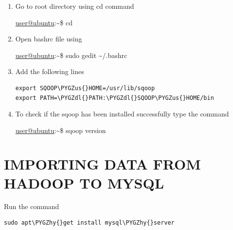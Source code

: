 \documentclass[a4paper,12pt,oneside]{sphinxmanual}
\def\PYGZus{\char`\_}
\def\PYGZdl{\char`\$}
\def\PYGZhy{\char`\-}
\begin{document}
\begin{enumerate}
\item {} 
Go to root directory using cd command

\href{mailto:user@ubuntu}{user@ubuntu}:\textasciitilde{}\$  cd

\item {} 
Open bashrc file using

\href{mailto:user@ubuntu}{user@ubuntu}:\textasciitilde{}\$  sudo gedit \textasciitilde{}/.bashrc

\item {} 
Add the following lines

\begin{Verbatim}[commandchars=\\\{\}]
export SQOOP\PYGZus{}HOME=/usr/lib/sqoop
export PATH=\PYGZdl{}PATH:\PYGZdl{}SQOOP\PYGZus{}HOME/bin
\end{Verbatim}

\item {} 
To check if the sqoop has been installed  successfully type the command

\href{mailto:user@ubuntu}{user@ubuntu}:\textasciitilde{}\$ sqoop version

\end{enumerate}


\section{IMPORTING DATA FROM HADOOP TO MYSQL}
\label{document:importing-data-from-hadoop-to-mysql}
Run the command

\begin{Verbatim}[commandchars=\\\{\}]
sudo apt\PYGZhy{}get install mysql\PYGZhy{}server
\end{Verbatim}
\end{document}
